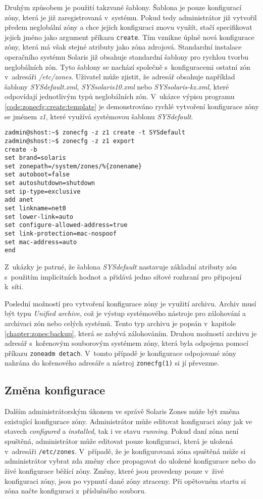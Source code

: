 Druhým způsobem je použití takzvané šablony. Šablona je pouze konfigurací zóny, která je již zaregistrovaná
v~systému. Pokud tedy administrátor již vytvořil předem neglobální zóny a chce jejich konfiguraci znovu využít, stačí
specifikovat jejich jméno jako argument příkazu \verb|create|. Tím vznikne úplně nová konfigurace zóny, která má však stejné
atributy jako zóna zdrojová. Standardní instalace operačního systému Solaris již obsahuje standardní šablony pro rychlou tvorbu
neglobálních zón. Tyto šablony se nachází společně s~konfiguracemi ostatní zón v~adresáři \textit{/etc/zones}. Uživatel
může zjistit, že adresář obsahuje například šablony \textit{SYSdefault.xml}, \textit{SYSsolaris10.xml} nebo
\textit{SYSsolaris-kz.xml}, které odpovídají jednotlivým typů neglobálních zón. V~ukázce výpisu programu \ref{code:zonecfg:create:template}
je demonstrováno rychlé vytvoření konfigurace zóny se jménem \textit{z1}, které využívá systémovou šablonu \textit{SYSdefault}.
\begin{lstlisting}[caption={Vytvorení zóny ze systémové šablony}, label={code:zonecfg:create:template}]
zadmin@shost:~$ zonecfg -z z1 create -t SYSdefault
zadmin@shost:~$ zonecfg -z z1 export
create -b
set brand=solaris
set zonepath=/system/zones/%{zonename}
set autoboot=false
set autoshutdown=shutdown
set ip-type=exclusive
add anet
set linkname=net0
set lower-link=auto
set configure-allowed-address=true
set link-protection=mac-nospoof
set mac-address=auto
end
\end{lstlisting}
Z~ukázky je patrné, že šablona \textit{SYSdefault} nastavuje základní atributy zón s~použitím implicitních hodnot a přidává
jedno síťové rozhraní pro připojení k~síti.

Poslední možností pro vytvoření konfigurace zóny je využití archivu. Archiv musí být typu \textit{Unified archive}, což je
výstup systémového nástroje pro zálohování a archivaci zón nebo celých systémů. Tento typ archivu je popsán  v~kapitole
\ref{chapter:zones:backup}, která se zabývá zálohováním. Druhou možností archivu je adresář s~kořenovým souborovým systémem
zóny, která byla odpojena pomocí příkazu \verb|zoneadm detach|. V~tomto případě je konfigurace odpojované zóny nahrána do 
kořenového adresáře a nástroj \verb|zonecfg(1)| si jí převezme.
\subsection{Změna konfigurace}
\label{chapter:zones:configuration:editing}
Dalším administrátorským úkonem ve správě Solaris Zones může být změna existující konfigurace zóny. Administrátor může editovat
konfiguraci zóny jak ve stavech \textit{configured} a \textit{installed}, tak i ve stavu \textit{running}. Pokud daní zóna není spuštěná,
administrátor může editovat pouze konfiguraci, která je uložená v~adresáři \verb|/etc/zones|. V~případě, že je konfigurovaná zóna spuštěná
může si administrátor vybrat zda změny chce propagovat do uložené konfigurace nebo do živé konfigurace běžící zóny. 
Změny, které jsou provedeny pouze v~živé konfiguraci zóny, jsou po vypnutí dané zóny ztraceny. Při opětovném startu si zóna
načte konfiguraci z~příslušného souboru.

